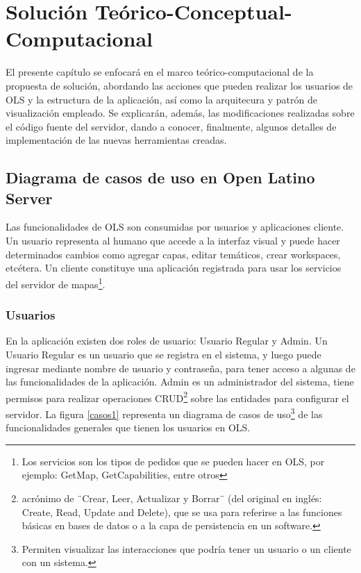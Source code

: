 
\chapter{Soluci\'on Te\'orico-Conceptual-Computacional}

El presente cap\'itulo se enfocar\'a en el marco te\'orico-computacional de la propuesta de soluci\'on, abordando las acciones que pueden realizar los usuarios de OLS y la estructura de la aplicaci\'on, as\'i como la arquitecura y patr\'on de visualizaci\'on empleado. Se explicar\'an, adem\'as, las modificaciones realizadas sobre el c\'odigo fuente del servidor, dando a conocer, finalmente, algunos detalles de implementaci\'on de las nuevas herramientas creadas.

\section{Diagrama de casos de uso en Open Latino Server}
Las funcionalidades de OLS son consumidas por usuarios y aplicaciones cliente. Un usuario representa al humano que accede a la interfaz visual y puede hacer determinados cambios como agregar capas, editar tem\'aticos, crear workspaces, etc\'etera. Un cliente constituye una aplicaci\'on registrada para usar los servicios del servidor de mapas\footnote{Los servicios son los tipos de pedidos que se pueden hacer en OLS, por ejemplo: GetMap, GetCapabilities, entre otros}.


\subsection{Usuarios}
En la aplicaci\'on existen dos roles de usuario: Usuario Regular y Admin. Un Usuario Regular es un usuario que se registra en el sistema, y luego puede ingresar mediante nombre de usuario y contrase\~na, para tener acceso a algunas de las funcionalidades de la aplicaci\'on. Admin es un administrador del sistema, tiene permisos para realizar operaciones CRUD\footnote{acr\'onimo de ¨Crear, Leer, Actualizar y Borrar¨ (del original en ingl\'es: Create, Read, Update and Delete), que se usa para referirse a las funciones b\'asicas en bases de datos o a la capa de persistencia en un software.} sobre las entidades para configurar el servidor. La figura \ref{casos1} representa un diagrama de casos de uso\footnote{Permiten visualizar las interacciones que podr\'ia tener un usuario o un cliente con un sistema.} de las funcionalidades generales que tienen los usuarios en OLS.

